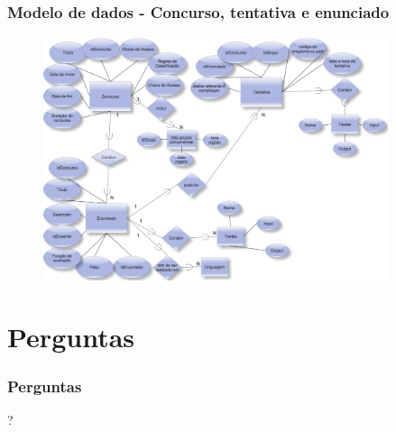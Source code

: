 \documentclass{beamer}
\begin{document}
\begin{frame} \frametitle{Modelo de dados - Concurso, tentativa e enunciado}
\begin{figure}[htbp]
\begin{center}
\includegraphics[width=0.9\textwidth]{../report1/Images/concurso-enunciado}
\end{center}
\end{figure}
\end{frame}

\section*{Perguntas}
\begin{frame} \frametitle{Perguntas}
\begin{center}\huge{?}\end{center}
\end{frame}
\end{document}
